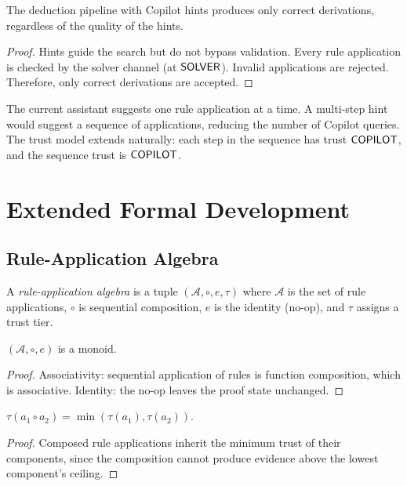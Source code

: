 \documentclass[11pt]{article}
\begin{document}
\begin{proposition}%
\label{prop:e2eded}
The deduction pipeline with Copilot hints produces only
correct derivations, regardless of the quality of the hints.
\end{proposition}
\begin{proof}
Hints guide the search but do not bypass validation.  Every
rule application is checked by the solver channel (at
$\mathsf{SOLVER}$).  Invalid applications are rejected.  Therefore,
only correct derivations are accepted.
\end{proof}

\begin{remark}
The current assistant suggests one rule application at a time.
A multi-step hint would suggest a sequence of applications,
reducing the number of Copilot queries.  The trust model
extends naturally: each step in the sequence has trust
$\mathsf{COPILOT}$, and the sequence trust is $\mathsf{COPILOT}$.
\end{remark}

\section{Extended Formal Development}\label{app:extended}

\subsection{Rule-Application Algebra}

\begin{definition}%
\label{def:raalg}
A \emph{rule-application algebra} is a tuple
$(\mathcal{A}, \circ, e, \tau)$ where $\mathcal{A}$ is the set
of rule applications, $\circ$ is sequential composition,
$e$ is the identity (no-op), and $\tau$ assigns a trust tier.
\end{definition}

\begin{lemma}%
\label{lem:raalgmonoid}
$(\mathcal{A}, \circ, e)$ is a monoid.
\end{lemma}
\begin{proof}
Associativity: sequential application of rules is function
composition, which is associative.
Identity: the no-op leaves the proof state unchanged.
\end{proof}

\begin{lemma}%
\label{lem:trusthomra}
$\tau(a_1 \circ a_2) = \min(\tau(a_1), \tau(a_2))$.
\end{lemma}
\begin{proof}
Composed rule applications inherit the minimum trust of
their components, since the composition cannot produce
evidence above the lowest component's ceiling.
\end{proof}
\end{document}
